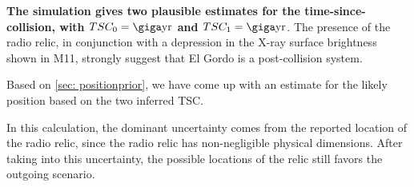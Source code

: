 
\textbf{The simulation gives two plausible estimates for
the time-since-collision, with $TSC_0 = \giga \text{yr}$ and $TSC_1 = \giga
\text{yr}$}. The presence of the radio relic, in conjunction with a
depression in the X-ray surface brightness shown in M11, strongly suggest
that El Gordo is a post-collision system. 

Based on \ref{sec: positionprior}, we have come up with an estimate for the
likely position based on the two inferred TSC. 

In this calculation, the dominant uncertainty comes from the
reported location of the radio relic, since the radio relic has non-negligible
physical dimensions. After taking into this uncertainty, the possible locations of the
relic still favors the outgoing scenario. 



